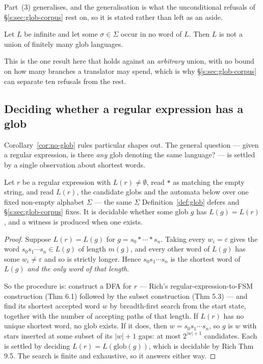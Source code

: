 

\noindent
Part~(3) generalises, and the generalisation is what the unconditional refusals of
\S\ref{s:sec:glob-corpus} rest on, so it is stated rather than left as an aside.

\begin{corollary}\label{cor:absent-char}
Let $L$ be infinite and let some $\sigma\in\Sigma$ occur in no word of $L$. Then $L$ is
not a union of finitely many glob languages.
\end{corollary}



\noindent
This is the one result here that holds against an \emph{arbitrary} union, with no bound
on how many branches a translator may spend, which is why \S\ref{s:sec:glob-corpus} can
separate ten refusals from the rest.

\subsection{Deciding whether a regular expression has a glob}
\label{s:sec:decide}

Corollary~\ref{cor:no-glob} rules particular shapes out. The general question --- given a
regular expression, is there \emph{any} glob denoting the same language? --- is settled by
a single observation about shortest words.

\begin{proposition}\label{prop:decidable}
Let $r$ be a regular expression with $L(r)\neq\emptyset$, read \texttt{*} as matching the
empty string, and read $L(r)$, the candidate globs and the automata below over one fixed
non-empty alphabet $\Sigma$ --- the same $\Sigma$ Definition~\ref{def:glob} defers and
\S\ref{s:sec:glob-corpus} fixes. It is decidable whether some glob $g$ has $L(g)=L(r)$,
and a witness is produced when one exists.
\end{proposition}
\begin{proof}
Suppose $L(r)=L(g)$ for $g=s_0*\cdots*s_n$. Taking every $w_i=\varepsilon$ gives the word
$s_0s_1\cdots s_n\in L(g)$ of length $m(g)$, and every other word of $L(g)$ has some
$w_i\neq\varepsilon$ and so is strictly longer. Hence $s_0s_1\cdots s_n$ is the shortest
word of $L(g)$ \emph{and the only word of that length}.

So the procedure is: construct a DFA for $r$ --- Rich's regular-expression-to-FSM
construction (Thm 6.1) followed by the subset construction (Thm 5.3) --- and find its
shortest accepted word $w$ by breadth-first search from the start state, together with
the number of accepting paths of that length. If $L(r)$ has no unique shortest word, no
glob exists. If it does, then $w=s_0s_1\cdots s_n$, so $g$ is $w$ with stars inserted at
some subset of its $|w|+1$ gaps: at most $2^{|w|+1}$ candidates. Each is settled by
deciding $L(r)=L(\mathrm{glob}(g))$, which is decidable by Rich Thm 9.5. The search is
finite and exhaustive, so it answers either way.
\end{proof}

